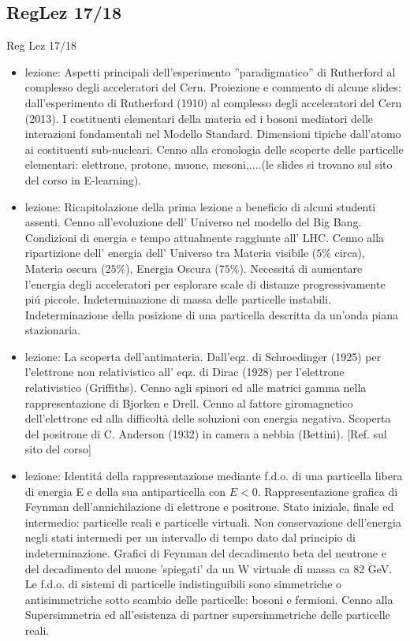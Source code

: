 \subsection{RegLez 17/18}
\begin{frame}[allowframebreaks]{Reg Lez 17/18}
\begin{itemize}
  
\item lezione: Aspetti principali dell'esperimento ''paradigmatico'' di Rutherford al complesso degli acceleratori del Cern. Proiezione e commento di alcune slides: dall'esperimento di Rutherford (1910) al complesso degli acceleratori del Cern (2013). I costituenti elementari della materia ed i bosoni mediatori delle interazioni fondamentali nel Modello Standard. Dimensioni tipiche dall'atomo ai costituenti sub-nucleari. Cenno alla cronologia delle scoperte delle particelle elementari: elettrone, protone, muone, mesoni,....(le slides si trovano sul sito del corso in E-learning). 

\item lezione: Ricapitolazione della prima lezione a beneficio di alcuni studenti assenti. Cenno all'evoluzione dell' Universo nel modello del Big Bang. Condizioni di energia e tempo attualmente raggiunte all' LHC. Cenno alla ripartizione dell' energia dell' Universo tra Materia visibile ($5\%$ circa), Materia oscura ($25\%$), Energia Oscura ($75\%$). Necessit\'a di aumentare l'energia degli acceleratori per esplorare scale di distanze progressivamente pi\'u piccole. Indeterminazione di massa delle particelle instabili. Indeterminazione della posizione di una particella descritta da un'onda piana stazionaria.

\item lezione: La scoperta dell'antimateria. Dall'eqz. di Schroedinger (1925) per l'elettrone non relativistico all' eqz. di Dirac (1928) per l'elettrone relativistico (Griffiths). Cenno agli spinori ed alle matrici gamma nella rappresentazione di Bjorken e Drell. Cenno al fattore giromagnetico dell'elettrone ed alla difficoltà delle soluzioni con energia negativa. Scoperta del positrone di C. Anderson (1932) in camera a nebbia (Bettini). [Ref. sul sito del corso]

\item lezione: Identit\'a della rappresentazione mediante f.d.o. di una particella libera di energia E e della sua antiparticella con $E<0$. Rappresentazione grafica di Feynman dell'annichilazione di elettrone e positrone. Stato iniziale, finale ed intermedio: particelle reali e particelle virtuali. Non conservazione dell'energia negli stati intermedi per un intervallo di tempo dato dal principio di indeterminazione. Grafici di Feynman del decadimento beta del neutrone e del decadimento del muone 'spiegati' da un W virtuale di massa ca 82 GeV. Le f.d.o. di sistemi di particelle indistinguibili sono simmetriche o antisimmetriche sotto scambio delle particelle: bosoni e fermioni. Cenno alla Supersimmetria ed all'esistenza di partner supersimmetriche delle particelle reali.


\end{itemize}
\end{frame}

